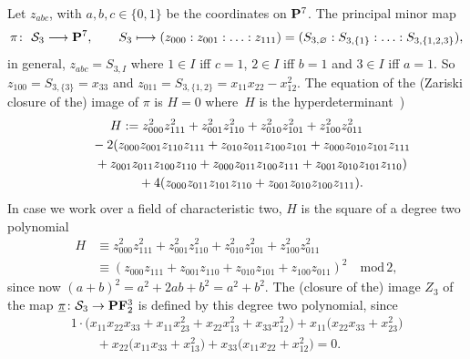 \documentclass[10pt,a4paper]{amsart}
\newcommand{\FF}{{\bf F}}
\newcommand{\PP}{{\bf P}}
\newcommand{\cS}{{\cal S}}
\numberwithin{equation}{section}
\providecommand{\cal}{\mathcal}
\begin{document}
\begin{Example}[the case $n=3$] \label{n3}
Let $z_{abc}$, with $a,b,c\in\{0,1\}$ be the coordinates on $\PP^7$. The principal minor map
\begin{gather*}
\pi\colon \ \cS_3 \longrightarrow \PP^7,\qquad S_3 \longmapsto (z_{000}:z_{001}:\ldots:z_{111})= (S_{3,\varnothing}:S_{3,\{1\}}:\ldots:S_{3,\{1,2,3\}}),
\end{gather*}
in general, $z_{abc}=S_{3,I}$ where $1\in I$ iff $c=1$, $2\in I$ iff $b=1$ and $3\in I$ iff $a=1$. So $z_{100}=S_{3,\{3\}}=x_{33}$ and $z_{011}=S_{3,\{1,2\}}=x_{11}x_{22}-x_{12}^2$. The equation of the (Zariski closure of the) image of $\pi$ is $H=0$ where~$H$ is the hyperdeterminant~\cite{HS,Oeding})
\begin{gather*}
H :=z_{000}^2z_{111}^2+z_{001}^2z_{110}^2+z_{010}^2z_{101}^2+z_{100}^2z_{011}^2\\
\hphantom{H :=}{} -2(z_{000}z_{001}z_{110}z_{111} + z_{010}z_{011}z_{100}z_{101} + z_{000}z_{010}z_{101}z_{111} \\
\hphantom{H :=}{} +z_{001}z_{011}z_{100}z_{110} + z_{000}z_{011}z_{100}z_{111} + z_{001}z_{010}z_{101}z_{110})\\
\hphantom{H :=}{} +4(z_{000}z_{011}z_{101}z_{110}+z_{001}z_{010}z_{100}z_{111}).
\end{gather*}
In case we work over a field of characteristic two, $H$ is the square of a degree two polynomial
\begin{align*}
H & \equiv z_{000}^2z_{111}^2+z_{001}^2z_{110}^2+z_{010}^2z_{101}^2+z_{100}^2z_{011}^2\\
& \equiv (z_{000}z_{111}+z_{001}z_{110}+z_{010}z_{101}+z_{100}z_{011})^2 \quad\text{mod}\, 2,
\end{align*}
since now $(a+b)^2=a^2+2ab+b^2=a^2+b^2$. The (closure of the) image $Z_3$ of the map $\underline{\pi}\colon \cS_3\rightarrow\PP\FF_2^3$ is defined by this degree two polynomial, since
\begin{gather*}
1\cdot\big(x_{11}x_{22}x_{33}+x_{11}x_{23}^2 +x_{22}x_{13}^2 + x_{33}x_{12}^2\big)+ x_{11}\big(x_{22}x_{33}+x_{23}^2\big)\\
 \qquad{} + x_{22}\big(x_{11}x_{33}+x_{13}^2\big)+ x_{33}\big(x_{11}x_{22}+x_{12}^2\big)=0.
\end{gather*}
\end{Example}
\end{document}
